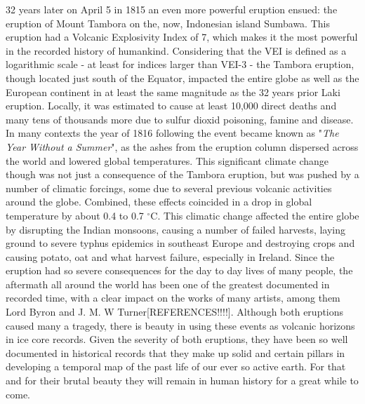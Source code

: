\documentclass[../../CompleteThesis/Complete_1stDraft]{subfiles}
\begin{document}
32 years later on April 5 in 1815 an even more powerful eruption ensued: the eruption of Mount Tambora on the, now, Indonesian island Sumbawa. This eruption had a Volcanic Explosivity Index of 7, which makes it the most powerful in the recorded history of humankind. Considering that the VEI is defined as a logarithmic scale - at least for indices larger than VEI-3 - the Tambora eruption, though located just south of the Equator, impacted the entire globe as well as the European continent in at least the same magnitude as the 32 years prior Laki eruption. Locally, it was estimated to cause at least 10,000 direct deaths and many tens of thousands more due to sulfur dioxid poisoning, famine and disease. In many contexts the year of 1816 following the event became known as "\textit{The Year Without a Summer}", as the ashes from the eruption column dispersed across the world and lowered global temperatures. This significant climate change though was not just a consequence of the Tambora eruption, but was pushed by a number of climatic forcings, some due to several previous volcanic activities around the globe. Combined, these effects coincided in a drop in global temperature by about 0.4 to 0.7 $^{\circ}$C. This climatic change affected the entire globe by disrupting the Indian monsoons, causing a number of failed harvests, laying ground to severe typhus epidemics in southeast Europe and destroying crops and causing potato, oat and what harvest failure, especially in Ireland. Since the eruption had so severe consequences for the day to day lives of many people, the aftermath all around the world has been one of the greatest documented in recorded time, with a clear impact on the works of many artists, among them Lord Byron and J. M. W Turner[REFERENCES!!!!]. Although both eruptions caused many a tragedy, there is beauty in using these events as volcanic horizons in ice core records. Given the severity of both eruptions, they have been so well documented in historical records that they make up solid and certain pillars in developing a temporal map of the past life of our ever so active earth. For that and for their brutal beauty they will remain in human history for a great while to come.
\end{document}
